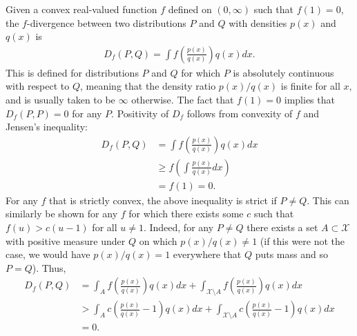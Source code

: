 

Given a convex real-valued function $f$ defined on $(0, \infty)$ such that $f(1)=0$, the $f$-divergence between two distributions $P$ and $Q$ with densities $p(x)$ and $q(x)$ is
%
\begin{align*}
D_f(P, Q) = \int f\left(\frac{p(x)}{q(x)}\right) q(x) dx.
\end{align*}
%
This is defined for distributions $P$ and $Q$ for which $P$ is absolutely continuous with respect to $Q$, meaning that the density ratio $p(x)/q(x)$ is finite for all $x$, and is usually taken to be $\infty$ otherwise.
The fact that $f(1)=0$ implies that $D_f(P,P) = 0$ for any $P$.
Positivity of $D_f$ follows from convexity of $f$ and Jensen's inequality:
%
\begin{align*}
D_f(P, Q) &= \int f\left(\frac{p(x)}{q(x)}\right) q(x) dx \\ 
&\geq f\left(\int \frac{p(x)}{q(x)} dx\right) \\
&= f(1) = 0.
\end{align*}
%
For any $f$ that is strictly convex, the above inequality is strict if $P\not=Q$.
This can similarly be shown for any $f$ for which there exists some $c$ such that $f(u) > c(u-1)$ for all $u\not=1$. 
Indeed, for any $P \not= Q$ there exists a set $A \subset \mathcal{X}$ with positive measure under $Q$ on which $p(x)/q(x) \not= 1$ (if this were not the case, we would have $p(x)/q(x) = 1$ everywhere that $Q$ puts mass and so $P=Q$).
Thus,
\begin{align*}
D_f(P, Q) &= \int_A f\left(\frac{p(x)}{q(x)}\right) q(x) dx +  \int_{\mathcal{X} \setminus A} f\left(\frac{p(x)}{q(x)}\right) q(x) dx\\ 
&> \int_A c \left(\frac{p(x)}{q(x)} - 1\right) q(x) dx +  \int_{\mathcal{X} \setminus A} c \left(\frac{p(x)}{q(x)} - 1\right) q(x) dx\\ 
&= 0.
\end{align*}

